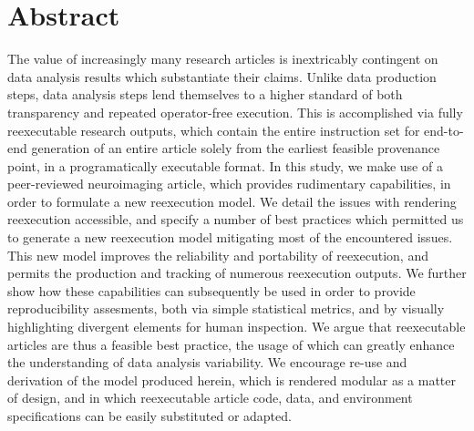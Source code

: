\section{Abstract}

The value of increasingly many research articles is inextricably contingent on data analysis results which substantiate their claims.
Unlike data production steps, data analysis steps lend themselves to a higher standard of both transparency and repeated operator-free execution.
This is accomplished via fully reexecutable research outputs, which contain the entire instruction set for end-to-end generation of an entire article solely from the earliest feasible provenance point, in a programatically executable format.
In this study, we make use of a peer-reviewed neuroimaging article, which provides rudimentary capabilities, in order to formulate a new reexecution model.
We detail the issues with rendering reexecution accessible, and specify a number of best practices which permitted us to generate a new reexecution model mitigating most of the encountered issues.
This new model improves the reliability and portability of reexecution, and permits the production and tracking of numerous reexecution outputs.
We further show how these capabilities can subsequently be used in order to provide reproducibility assesments, both via simple statistical metrics, and by visually highlighting divergent elements for human inspection.
We argue that reexecutable articles are thus a feasible best practice, the usage of which can greatly enhance the understanding of data analysis variability.
We encourage re-use and derivation of the model produced herein, which is rendered modular as a matter of design, and in which reexecutable article code, data, and environment specifications can be easily substituted or adapted.


